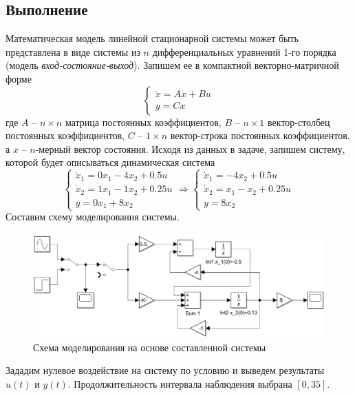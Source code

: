 \documentclass[a4paper, 12pt]{article}
\begin{document}
    \subsection{Выполнение}
    Математическая модель линейной стационарной системы может быть представлена в виде системы
    из $n$ дифференциальных уравнений 1-го порядка (модель \textit{вход-состояние-выход}).
    Запишем ее в компактной векторно-матричной форме
    $$
    \begin{cases}
        \dot{x}=Ax+Bu\\
        y=Cx
    \end{cases}
    $$
    где $A$ -- $n\times n$ матрица постоянных коэффициентов, $B$ -- $n\times1$ вектор-столбец постоянных
    коэффициентов, $C$ -- $1\times n$ вектор-строка постоянных коэффициентов, а $x$ -- $n$-мерный вектор состояния.
    Исходя из данных в задаче, запишем систему, которой будет описываться динамическая система
    $$
    \begin{cases}
    \dot{x}_1=0x_1-4x_2+0.5u\\
    \dot{x}_2=1x_1-1x_2+0.25u\\
    y=0x_1+8x_2
    \end{cases}
    \Rightarrow
    \begin{cases}
        \dot{x}_1=-4x_2+0.5u\\
        \dot{x}_2=x_1-x_2+0.25u\\
        y=8x_2
    \end{cases}
    $$
    Составим схему моделирования системы.
    \begin{figure}[H]
        \centering
        \includegraphics[scale=0.435]{scheme2.png}
        \captionsetup{skip=0pt}
        \caption{Схема моделирования на основе составленной системы}
        \label{fig:scheme2}
    \end{figure}
    Зададим нулевое воздействие на систему по условию и выведем результаты $u(t)$ и $y(t)$.
    Продолжительность интервала наблюдения выбрана $[0,35]$.
\end{document}
